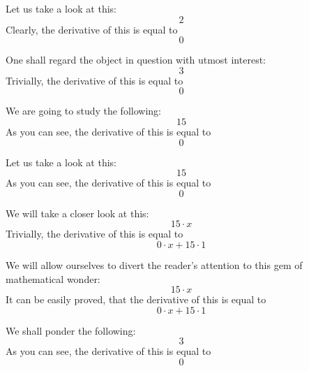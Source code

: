\documentclass{article}
\begin{document}
Let us take a look at this:
\begin{equation}
2 
\end{equation}
Clearly, the derivative of this is equal to
\begin{equation}
0 
\end{equation}

One shall regard the object in question with utmost interest:
\begin{equation}
3 
\end{equation}
Trivially, the derivative of this is equal to
\begin{equation}
0 
\end{equation}

We are going to study the following:
\begin{equation}
15 
\end{equation}
As you can see, the derivative of this is equal to
\begin{equation}
0 
\end{equation}

Let us take a look at this:
\begin{equation}
15 
\end{equation}
As you can see, the derivative of this is equal to
\begin{equation}
0 
\end{equation}

We will take a closer look at this:
\begin{equation}
15 \cdot x 
\end{equation}
Trivially, the derivative of this is equal to
\begin{equation}
0 \cdot x + 15 \cdot 1 
\end{equation}

We will allow ourselves to divert the reader's attention to this gem of mathematical wonder:
\begin{equation}
15 \cdot x 
\end{equation}
It can be easily proved, that the derivative of this is equal to
\begin{equation}
0 \cdot x + 15 \cdot 1 
\end{equation}

We shall ponder the following:
\begin{equation}
3 
\end{equation}
As you can see, the derivative of this is equal to
\begin{equation}
0 
\end{equation}
\end{document}
